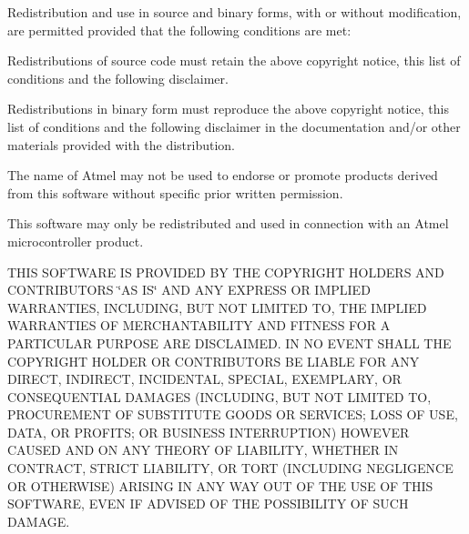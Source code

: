Redistribution and use in source and binary forms, with or without modification, are permitted provided that the following conditions are met\+:


\begin{DoxyEnumerate}
\item Redistributions of source code must retain the above copyright notice, this list of conditions and the following disclaimer.
\item Redistributions in binary form must reproduce the above copyright notice, this list of conditions and the following disclaimer in the documentation and/or other materials provided with the distribution.
\item The name of Atmel may not be used to endorse or promote products derived from this software without specific prior written permission.
\item This software may only be redistributed and used in connection with an Atmel microcontroller product.
\end{DoxyEnumerate}

T\+H\+IS S\+O\+F\+T\+W\+A\+RE IS P\+R\+O\+V\+I\+D\+ED BY T\+HE C\+O\+P\+Y\+R\+I\+G\+HT H\+O\+L\+D\+E\+RS A\+ND C\+O\+N\+T\+R\+I\+B\+U\+T\+O\+RS \char`\"{}\+A\+S I\+S\char`\"{} A\+ND A\+NY E\+X\+P\+R\+E\+SS OR I\+M\+P\+L\+I\+ED W\+A\+R\+R\+A\+N\+T\+I\+ES, I\+N\+C\+L\+U\+D\+I\+NG, B\+UT N\+OT L\+I\+M\+I\+T\+ED TO, T\+HE I\+M\+P\+L\+I\+ED W\+A\+R\+R\+A\+N\+T\+I\+ES OF M\+E\+R\+C\+H\+A\+N\+T\+A\+B\+I\+L\+I\+TY A\+ND F\+I\+T\+N\+E\+SS F\+OR A P\+A\+R\+T\+I\+C\+U\+L\+AR P\+U\+R\+P\+O\+SE A\+RE D\+I\+S\+C\+L\+A\+I\+M\+ED. IN NO E\+V\+E\+NT S\+H\+A\+LL T\+HE C\+O\+P\+Y\+R\+I\+G\+HT H\+O\+L\+D\+ER OR C\+O\+N\+T\+R\+I\+B\+U\+T\+O\+RS BE L\+I\+A\+B\+LE F\+OR A\+NY D\+I\+R\+E\+CT, I\+N\+D\+I\+R\+E\+CT, I\+N\+C\+I\+D\+E\+N\+T\+AL, S\+P\+E\+C\+I\+AL, E\+X\+E\+M\+P\+L\+A\+RY, OR C\+O\+N\+S\+E\+Q\+U\+E\+N\+T\+I\+AL D\+A\+M\+A\+G\+ES (I\+N\+C\+L\+U\+D\+I\+NG, B\+UT N\+OT L\+I\+M\+I\+T\+ED TO, P\+R\+O\+C\+U\+R\+E\+M\+E\+NT OF S\+U\+B\+S\+T\+I\+T\+U\+TE G\+O\+O\+DS OR S\+E\+R\+V\+I\+C\+ES; L\+O\+SS OF U\+SE, D\+A\+TA, OR P\+R\+O\+F\+I\+TS; OR B\+U\+S\+I\+N\+E\+SS I\+N\+T\+E\+R\+R\+U\+P\+T\+I\+ON) H\+O\+W\+E\+V\+ER C\+A\+U\+S\+ED A\+ND ON A\+NY T\+H\+E\+O\+RY OF L\+I\+A\+B\+I\+L\+I\+TY, W\+H\+E\+T\+H\+ER IN C\+O\+N\+T\+R\+A\+CT, S\+T\+R\+I\+CT L\+I\+A\+B\+I\+L\+I\+TY, OR T\+O\+RT (I\+N\+C\+L\+U\+D\+I\+NG N\+E\+G\+L\+I\+G\+E\+N\+CE OR O\+T\+H\+E\+R\+W\+I\+SE) A\+R\+I\+S\+I\+NG IN A\+NY W\+AY O\+UT OF T\+HE U\+SE OF T\+H\+IS S\+O\+F\+T\+W\+A\+RE, E\+V\+EN IF A\+D\+V\+I\+S\+ED OF T\+HE P\+O\+S\+S\+I\+B\+I\+L\+I\+TY OF S\+U\+CH D\+A\+M\+A\+GE.


